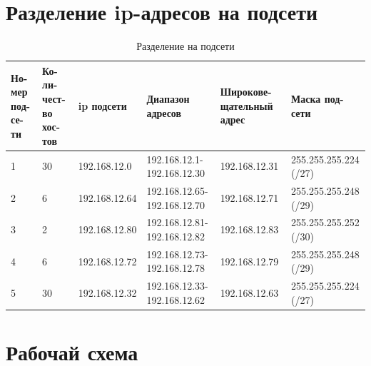 \section{Разделение ip-адресов на подсети}%
\label{sec:1}
\begin{table}[H]
    \centering
    \caption{Разделение на подсети}
    \label{tab:networks}
    \begin{tabular}{|p{0.8cm}|p{1cm}|p{3cm}|p{3cm}|p{3cm}|p{3.2cm}|}
        \hline
        Но-мер под-се-ти & Ко-ли-чест-во хос-тов & ip подсети & Диапазон адресов & Широкове-щательный адрес & Маска под-сети \\
        \hline
        1 & 30 & 192.168.12.0 & 192.168.12.1-192.168.12.30 & 192.168.12.31 & 255.255.255.224 (/27) \\
        \hline
        2 & 6 & 192.168.12.64 & 192.168.12.65-192.168.12.70 & 192.168.12.71 & 255.255.255.248 (/29) \\
        \hline
        3 & 2 & 192.168.12.80 & 192.168.12.81-192.168.12.82 & 192.168.12.83 & 255.255.255.252 (/30) \\
        \hline
        4 & 6 & 192.168.12.72 & 192.168.12.73-192.168.12.78 & 192.168.12.79 & 255.255.255.248 (/29) \\
        \hline
        5 & 30 & 192.168.12.32 & 192.168.12.33-192.168.12.62 & 192.168.12.63 & 255.255.255.224 (/27) \\
        \hline
    \end{tabular}
\end{table}
\newpage
\section{Рабочай схема}%
\label{sec:work_schema}


